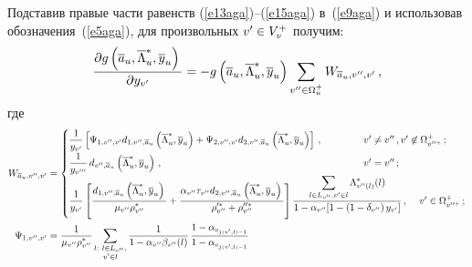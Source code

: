    Подставив правые части равенств (\ref{e13aga})--(\ref{e15aga}) 
в~(\ref{e9aga}) и использовав обозначения~(\ref{e5aga}), для произвольных 
$v^\prime\hm\in V_v^+$ получим:
   \begin{equation}
   \displaystyle\frac{\displaystyle \partial g \left(\overline{a}_u, \overline{\Lambda}_u^*, 
\overline{y}_u\right)\mathstrut}{\displaystyle \partial y_{v^\prime}\mathstrut} =-g\left(\overline{a}_u, 
\overline{\Lambda}_u^*, \overline{y}_u\right)\sum\limits_{v^{\prime\prime} \in \Omega_u^+} W_{\overline{a}_u, 
v^{\prime\prime},v^\prime}\,,
   \label{e16aga}
   \end{equation}
где 
\begin{align*}
W_{\overline{a}_u, v^{\prime\prime}, v^\prime}&=
\begin{cases}
\fr{1}{y_{v^\prime}} \left[ \Psi_{1, v^{\prime\prime}, v^\prime} d_{1, 
v^{\prime\prime}, \overline{a}_u}\left(\overline{\Lambda}_u^*, \overline{y}_u\right) 
+\Psi_{2, v^{\prime\prime}, v^\prime} d_{2, v^{\prime\prime}, \overline{a}_u}
\left(\overline{\Lambda}_u^*, \overline{y}_u\right) \right]\,,\ &\hspace*{-20mm} 
v^\prime \not= v^{\prime\prime}\,, v^\prime\not\in\Omega^+_{v^{\prime\prime +}}\,;\\
\fr{1}{y_{v^{\prime\prime\prime}}}\, d_{v^{\prime\prime}, \overline{a}_u} 
\left(\overline{\Lambda}_u^*, \overline{y}_u\right)\,,\ & \hspace*{-20mm}v^\prime=v^{\prime\prime}\,;\\
\fr{1}{y_{v^\prime}}\left[ 
\fr{d_{1, v^{\prime\prime}, \overline{a}_u}\left(\overline{\Lambda}^*_u, 
\overline{y}_u\right)}{\mu_{ v^{\prime\prime}} \rho_{ v^{\prime\prime}}^*}+
\fr{\alpha_{ v^{\prime\prime}}\tau_{ v^{\prime\prime}} d_{2, v^{\prime\prime}, 
\overline{a}_u}\left(\overline{\Lambda}_u^*, \overline{y}_u\right)}
{\rho_{ v^{\prime\prime}}^{\prime *}+\rho_{ v^{\prime\prime}}^{\prime\prime 
*}}\right] \fr{\sum\limits_{l\in L_{ v^{\prime\prime}}, v^\prime \in l} 
\Lambda^*_{v^{\prime\prime}(l)}(l)}{1-\alpha_{ v^{\prime\prime}}[1-\left(1-
\delta_{ v^{\prime\prime}}\right)y_{v^\prime}]}\,,\ & v^\prime\in\Omega^+_{v^{\prime\prime +}}\,;
\end{cases}
\\
   \Psi_{1, v^{\prime\prime}, v^\prime} &=\fr{1}{\mu_{ v^{\prime\prime}} 
\rho^*_{ v^{\prime\prime}}}  %
\sum\limits_{\substack{{l:\ l\in L_{ v^{\prime\prime}},}\\ {v^\prime\in l}}} \fr{1}{1-\alpha_{ v^{\prime\prime}}\beta_{ 
v^{\prime\prime}}(l)}\,
   \fr{1-\alpha_{v_{j(v^\prime,l)-1}}}{1-\alpha_{ v_{j(v^\prime,l)-1}}
}
\end{align*}
